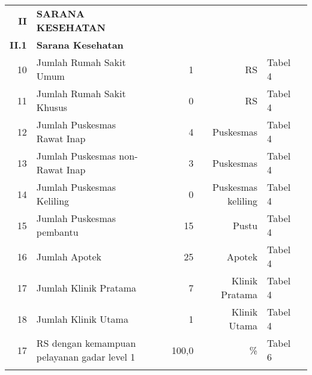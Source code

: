 \begin{small}
\begin{longtable}{rY{12em}rrrrY{5em}Y{5em}}
    \textbf{II} & \textbf{SARANA KESEHATAN}                                           &        &        &                    &          &                                &          \\
    \textbf{II.1} & \textbf{Sarana Kesehatan}                                         &        &        &                    &          &                                &          \\
	 10 & Jumlah Rumah Sakit Umum                                                     &                 &        &            1 & RS                             & Tabel 4  \\
	 11 & Jumlah Rumah Sakit Khusus                                                   &                 &        &            0 & RS                             & Tabel 4  \\
	 12 & Jumlah Puskesmas Rawat Inap                                                 &                 &        &            4 & Puskesmas                      & Tabel 4  \\
	 13 & Jumlah Puskesmas non-Rawat Inap                                             &                 &        &            3 & Puskesmas                      & Tabel 4  \\
	 14 & Jumlah Puskesmas Keliling                                                   &                 &        &            0 & Puskesmas keliling             & Tabel 4  \\
	 15 & Jumlah Puskesmas pembantu                                                   &                 &        &           15 & Pustu                          & Tabel 4  \\
	 16 & Jumlah Apotek                                                               &                 &        &           25 & Apotek                         & Tabel 4  \\
	 17 & Jumlah Klinik Pratama                                                       &                 &        &            7 & Klinik Pratama                 & Tabel 4  \\
	 18 & Jumlah Klinik Utama                                                         &                 &        &            1 & Klinik Utama                   & Tabel 4  \\
	 17 & RS dengan kemampuan pelayanan gadar level 1                                 &                 &        &        100,0 & \%                             & Tabel 6  \\
	    &                                                                             &        &        &                    &          &                                &          \\ 

\end{longtable}
\end{small}
